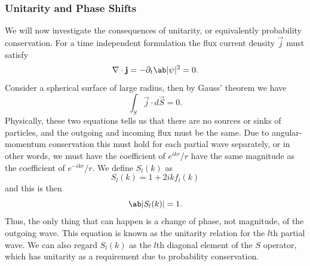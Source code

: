 \subsubsection{Unitarity and Phase Shifts}
We will now investigate the consequences of unitarity, or equivalently probability conservation. For a time independent formulation the flux current density $\vec{j}$ must satisfy
\begin{equation}
    \nabla \cdot \vec{j} = -\partial_t \abs{\psi}^2 = 0.
\end{equation}
Consider a spherical surface of large radius, then by Gauss' theorem we have
\begin{equation}
    \int_S \vec{j} \cdot d\vec{S} = 0.
\end{equation}
Physically, these two equations tells us that there are no sources or sinks of particles, and the outgoing and incoming flux must be the same.
Due to angular-momentum conservation this must hold for each partial wave separately, or in other words, we must have the coefficient of $e^{ikr}/r $ have the same magnitude as the coefficient of $e^{-ikr}/r$. We define $S_l(k)$ as
\begin{equation}
    S_l(k) = 1 + 2 i k f_l(k)
\end{equation}
and this is then
\begin{equation}
    \abs{S_l(k)} = 1.
\end{equation}
Thus, the only thing that can happen is a change of phase, not magnitude, of the outgoing wave. This equation is known as the unitarity relation for the $l$th partial wave. We can also regard $S_l(k)$ as the $l$th diagonal element of the $S$ operator, which has unitarity as a requirement due to probability conservation.

